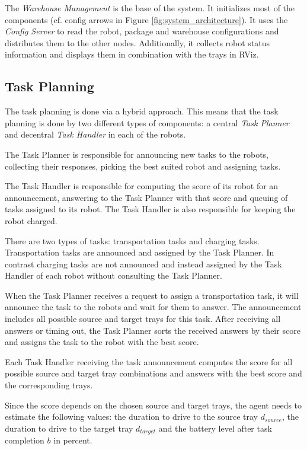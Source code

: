 \documentclass[journal]{IEEEtran}
\begin{document}
The \emph{Warehouse Management} is the base of the system. It initializes most of the components (cf. config arrows in Figure \ref{fig:system_architecture}). It uses the \emph{Config Server} to read the robot, package and warehouse configurations and distributes them to the other nodes. Additionally, it collects robot status information and displays them in combination with the trays in RViz.



\subsection{Task Planning}
\label{subsec:task_planning}
The task planning is done via a hybrid approach. This means that the task planning is done by two different types of components: a central \textit{Task Planner} and decentral \textit{Task Handler} in each of the robots.

The Task Planner is responsible for announcing new tasks to the robots, collecting their responses, picking the best suited robot and assigning tasks.

The Task Handler is responsible for computing the score of its robot for an announcement, answering to the Task Planner with that score and queuing of tasks assigned to its robot. The Task Handler is also responsible for keeping the robot charged.

There are two types of tasks: transportation tasks and charging tasks. Transportation tasks are announced and assigned by the Task Planner. In contrast charging tasks are not announced and instead assigned by the Task Handler of each robot without consulting the Task Planner.

When the Task Planner receives a request to assign a transportation task, it will announce the task to the robots and wait for them to answer.
The announcement includes all possible source and target trays for this task.
After receiving all answers or timing out, the Task Planner sorts the received answers by their score and assigns the task to the robot with the best score.

Each Task Handler receiving the task announcement computes the score for all possible source and target tray combinations and answers with the best score and the corresponding trays.

Since the score depends on the chosen source and target trays, the agent needs to estimate the following values: the duration to drive to the source tray $d_{source}$, the duration to drive to the target tray $d_{target}$ and the battery level after task completion $b$ in percent.
\end{document}
